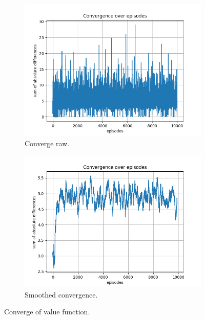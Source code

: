 \documentclass{assignment}
\begin{document}
\begin{figure}[H]
    \begin{subfigure}{0.5\textwidth}
        \includegraphics[width=\textwidth]{figures/convergence_q/gamma_sweep/convergence_Q_alpha_0.1_gamma_0.75_epislon_0.2.png}
    \caption{Converge raw.}
    \end{subfigure}\hfill
    \begin{subfigure}{0.5\textwidth}
        \includegraphics[width=\textwidth]{figures/convergence_q/gamma_sweep/convergence_Q_smoothed_alpha_0.1_gamma_0.75_epislon_0.2.png}
    \caption{Smoothed convergence.}
    \end{subfigure}
    \caption{Converge of value function.}
    \label{fig:gamma_0.75_q_learning_convergence}
\end{figure}
\end{document}
